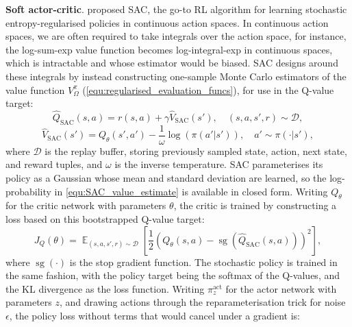 \documentclass{article} %
\DeclareMathOperator*{\E}{\mathbb{E}}
\newcommand\expectwrt[2]{\E_{#2}\left[ #1 \right]}
\begin{document}
        \textbf{Soft actor-critic}.
            \citet{haarnoja2018soft} proposed SAC, the go-to RL algorithm for learning stochastic entropy-regularised policies in continuous action spaces. In continuous action spaces, we are often required to take integrals over the action space, for instance, the log-sum-exp value function becomes log-integral-exp in continuous spaces, which is intractable and whose estimator would be biased. SAC designs around these integrals by instead constructing one-sample Monte Carlo estimators of the value function $V^\pi_\Omega$ (\autoref{equ:regularised_evaluation_funcs}), for use in the Q-value target:
            \begin{equation}
                \label{equ:q_val_target_sac}
                \hat{Q}_\text{SAC}(s,a) = r(s,a) + \gamma \hat{V}_\text{SAC}(s'), \quad (s, a, s', r) \sim \mathcal{D},
            \end{equation}
            \begin{equation}
                \label{equ:SAC_value_estimate}
                \hat{V}_\text{SAC}(s') = Q_\theta(s', a') - \frac{1}{\omega}\log(\pi(a'|s')), \quad a' \sim \pi(\cdot|s'),
            \end{equation}
            where $\mathcal{D}$ is the replay buffer, storing previously sampled state, action, next state, and reward tuples, and $\omega$ is the inverse temperature. SAC parameterises its policy as a Gaussian whose mean and standard deviation are learned, so the log-probability in \autoref{equ:SAC_value_estimate} is available in closed form. Writing $Q_\theta$ for the critic network with parameters $\theta$, the critic is trained by constructing a loss based on this bootstrapped Q-value target:
            \begin{equation}
                \label{equ:sac_Q_loss}
                J_Q(\theta) = \expectwrt{\frac{1}{2}\left(Q_\theta(s, a) - \operatorname{sg}\left( \hat{Q}_\text{SAC}(s,a) \right) \right)^2}{(s,a,s',r)\sim \mathcal{D}},
            \end{equation}
            where $\operatorname{sg}(\cdot)$ is the stop gradient function.
            The stochastic policy is trained in the same fashion, with the policy target being the softmax of the Q-values, and the KL divergence as the loss function. Writing $\pi^\text{act}_{z}$ for the actor network with parameters $z$, and drawing actions through the reparameterisation trick for noise $\epsilon$, the policy loss without terms that would cancel under a gradient is:
\end{document}
